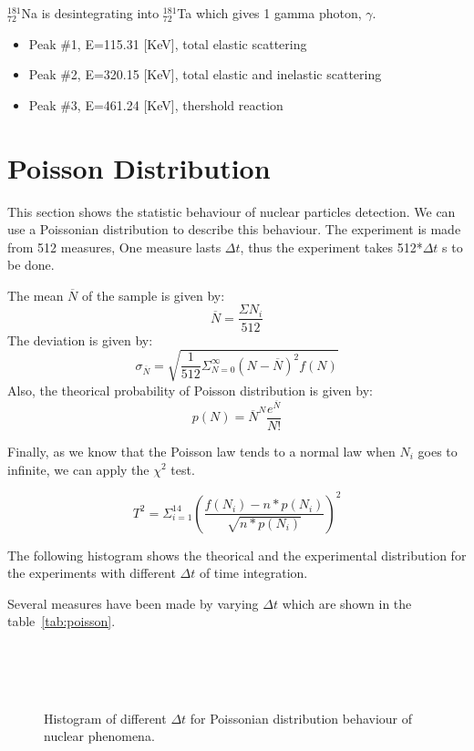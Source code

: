\documentclass[a4paper,12pt,oneside]{article}
\begin{document}
$_{72}^{181}$Na is desintegrating into $_{72}^{181}$Ta which gives 1 gamma photon, $\gamma$.

\begin{itemize}
\item Peak \#1, E=115.31 [KeV], total elastic scattering
\item Peak \#2, E=320.15 [KeV], total elastic and inelastic scattering
\item Peak \#3, E=461.24 [KeV], thershold reaction
\end{itemize}

\newpage
\section{Poisson Distribution}

This section shows the statistic behaviour of nuclear particles detection. We can use a Poissonian distribution to describe this behaviour.
The experiment is made from 512 measures, One measure lasts $\Delta t$, thus the experiment takes 512*$\Delta t$ s to be done.

The mean $\overline{N}$ of the sample is given by: $$\overline{N}=\frac{\Sigma N_i}{512}$$
The deviation is given by: $$\sigma_{\overline{N}}=\sqrt{\frac{1}{512}\Sigma^{\infty}_{N=0} (N-\overline{N})^2 f(N)}$$
Also, the theorical probability of Poisson distribution is given by: $$p(N)=\overline{N}^N \frac{e^{\overline{N}}}{N!}$$

Finally, as we know that the Poisson law tends to a normal law when $N_i$ goes to infinite, we can apply the $\chi^2$ test.

$$T^2=\Sigma^{14}_{i=1}{\left(\frac{f(N_i)-n*p(N_i)}{\sqrt{n*p(N_i)}}\right)^2}$$

The following histogram shows the theorical and the experimental distribution for the experiments with different $\Delta t$ of time integration.

Several measures have been made by varying $\Delta t$ which are shown in the table~\ref{tab:poisson}.

\begin{figure}[h!]
	\centering

	\\
	\\
	\\
	\label{figur}\caption{Histogram of different $\Delta t$ for Poissonian distribution behaviour of nuclear phenomena.}
\end{figure}
\end{document}
